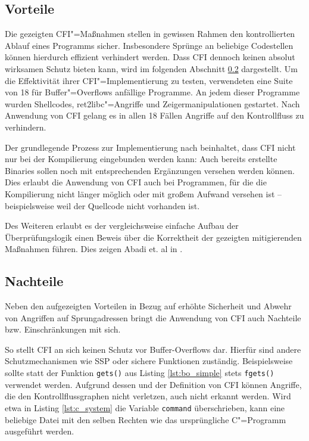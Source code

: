 \documentclass[12pt,%
               oneside,
               a4paper]{uiothesis}
\begin{document}
\subsection{Vorteile}

Die gezeigten CFI"=Maßnahmen stellen in gewissen Rahmen den kontrollierten Ablauf eines Programms sicher. Insbesondere Sprünge an beliebige Codestellen können hierdurch effizient verhindert werden. Dass CFI dennoch keinen absolut wirksamen Schutz bieten kann, wird im folgenden Abschnitt \ref{sec:disadv} dargestellt.
Um die Effektivität ihrer CFI"=Implementierung zu testen, verwendeten \cite{Abadi.2009} eine Suite von 18 für Buffer"=Overflows anfällige Programme. An jedem dieser Programme wurden Shellcodes, ret2libc"=Angriffe und Zeigermanipulationen gestartet. Nach Anwendung von CFI gelang es in allen 18 Fällen Angriffe auf den Kontrollfluss zu verhindern.

Der grundlegende Prozess zur Implementierung nach \cite{Abadi.2009} beinhaltet, dass CFI nicht nur bei der Kompilierung eingebunden werden kann: Auch bereits erstellte Binaries sollen noch mit entsprechenden Ergänzungen versehen werden können. Dies erlaubt die Anwendung von CFI auch bei Programmen, für die die Kompilierung nicht länger möglich oder mit großem Aufwand versehen ist -- beispielsweise weil der Quellcode nicht vorhanden ist.

Des Weiteren erlaubt es der vergleichsweise einfache Aufbau der Überprüfungslogik einen Beweis über die Korrektheit der gezeigten mitigierenden Maßnahmen führen. Dies zeigen Abadi et. al in \cite{Abadi.2009}.


\subsection{Nachteile}
\label{sec:disadv}
Neben den aufgezeigten Vorteilen in Bezug auf erhöhte Sicherheit und Abwehr von Angriffen auf Sprungadressen bringt die Anwendung von CFI auch Nachteile bzw. Einschränkungen mit sich.

So stellt CFI an sich keinen Schutz vor Buffer-Overflows dar. Hierfür sind andere Schutzmechanismen wie SSP oder sichere Funktionen zuständig. Beispielsweise sollte statt der Funktion \texttt{gets()} aus Listing \ref{lst:bo_simple} stets \texttt{fgets()} verwendet werden. Aufgrund dessen und der Definition von CFI können Angriffe, die den Kontrollflussgraphen nicht verletzen, auch nicht erkannt werden. Wird etwa in Listing \ref{lst:c_system} die Variable \texttt{command} überschrieben, kann eine beliebige Datei mit den selben Rechten wie das ursprüngliche C"=Programm ausgeführt werden.
\end{document}
